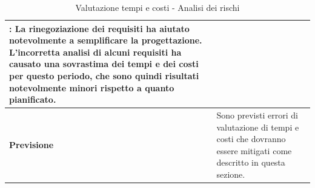 \documentclass[12pt,a4paper]{article}
\begin{document}
\begin{table}[H]
\begin{center}
\begin{tabular}{p{} p{}}
                \textbf{\FPD{}}: La rinegoziazione dei requisiti ha aiutato notevolmente a semplificare
                    la progettazione. L'incorretta analisi di alcuni requisiti ha causato una sovrastima dei tempi
                    e dei costi per questo periodo, che sono quindi risultati notevolmente minori rispetto a quanto
                    pianificato. \\
            \midrule
            \textbf{Previsione} & Sono previsti errori di valutazione di tempi e costi che dovranno essere mitigati come descritto in questa sezione. \\
			\bottomrule
		\end{tabular}
		\caption{Valutazione tempi e costi - Analisi dei rischi}
	\end{center}
\end{table}
\end{document}
